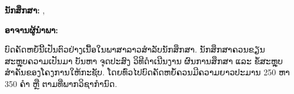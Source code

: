 
\begin{center}
\textbf{\thesistitlelo}
\end{center}

\noindent\textbf{ນັກສຶກສາ:} \studentAlo, \studentBlo

\noindent\textbf{ອາຈານຜູ້ນຳພາ:} \advisorlo

\vspace{0.5cm}
\noindent ບົດຄັດຫຍໍ້ນີ້ເປັນຕົວຢ່າງເນື້ອໃນພາສາລາວສຳລັບນັກສຶກສາ. ນັກສຶກສາຄວນຂຽນສະຫຼຸບຄວາມເປັນມາ ບັນຫາ ຈຸດປະສົງ ວິທີດຳເນີນງານ ຜົນການສຶກສາ ແລະ ຂໍ້ສະຫຼຸບສຳຄັນຂອງໂຄງການໃຫ້ກະຊັບ. ໂດຍທົ່ວໄປບົດຄັດຫຍໍ້ຄວນມີຄວາມຍາວປະມານ 250 ຫາ 350 ຄຳ ຫຼື ຕາມທີ່ພາກວິຊາກຳນົດ.

\vspace{0.5cm}

\clearpage
